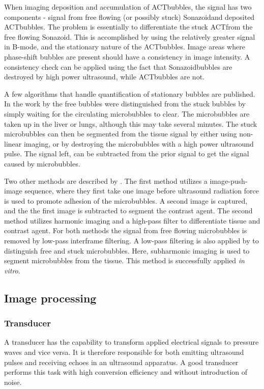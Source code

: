 When imaging deposition and accumulation of ACT\texttrademark bubbles, the signal has two components - signal from free flowing (or possibly stuck) Sonazoid\texttrademark and deposited ACT\texttrademark bubbles. The problem is essentially to differentiate the stuck ACT\texttrademark from the free flowing Sonazoid\texttrademark. This is accomplished by using the relatively greater signal in B-mode, and the stationary nature of the ACT\texttrademark bubbles. Image areas where phase-shift bubbles are present should have a consistency in image intensity. A consistency check can be applied using the fact that Sonazoid\texttrademark bubbles are destroyed by high power ultrasound, while ACT\texttrademark bubbles are not. 

A few algorithms that handle quantification of stationary bubbles are published. In the work by \citet{Rychak2006} the free bubbles were distinguished from the stuck bubbles by simply waiting for the circulating microbubbles to clear. The microbubbles are taken up in the liver or lungs, although this may take several minutes. The stuck microbubbles can then be segmented from the tissue signal by either using non-linear imaging, or by destroying the microbubbles with a high power ultrasound pulse. The signal left, can be subtracted from the prior signal to get the signal caused by microbubbles.

Two other methods are described by \citet{Zhao2007}. The first method utilizes a image-push-image sequence, where they first take one image before ultrasound radiation force is used to promote adhesion of the microbubbles. A second image is captured, and the the first image is subtracted to segment the contrast agent. The second method utilizes harmonic imaging and a high-pass filter to differentiate tissue and contrast agent. For both methods the signal from free flowing microbubbles is removed by low-pass interframe filtering. A low-pass filtering is also applied by \citet{Needles2009} to distinguish free and stuck microbubbles. Here, subharmonic imaging is used to segment microbubbles from the tissue. This method is successfully applied \textit{in vitro}.  
   
\subsection{Image processing}
\subsubsection{Transducer}
A transducer has the capability to transform applied electrical signals to pressure waves and vice versa. It is therefore responsible for both emitting ultrasound pulses and receiving echoes in an ultrasound apparatus. A good transducer performs this task with high conversion efficiency and without introduction of noise. 

